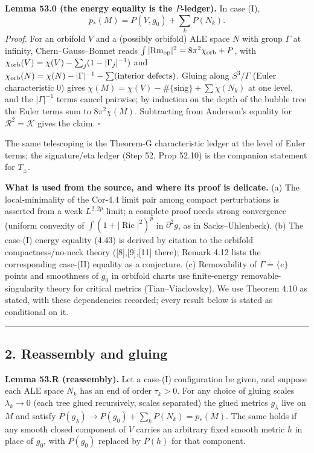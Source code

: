 \documentclass[
  10pt,
]{report}
\begin{document}
\textbf{Lemma 53.0 (the energy equality is the \(P\)-ledger).} In case
(I), \[
p_*(M)=P(V,g_0)+\sum_kP(N_k).
\] \emph{Proof.} For an orbifold \(V\) and a (possibly orbifold) ALE
space \(N\) with group \(\Gamma\) at infinity, Chern--Gauss--Bonnet
reads \(\int|\mathrm{Rm}_{\rm op}|^2=8\pi^2\chi_{\rm orb}+P\), with
\(\chi_{\rm orb}(V)=\chi(V)-\sum_j(1-|\Gamma_j|^{-1})\) and
\(\chi_{\rm orb}(N)=\chi(N)-|\Gamma|^{-1}-\sum(\text{interior defects})\).
Gluing along \(S^3/\Gamma\) (Euler characteristic 0) gives
\(\chi(M)=\chi(V)-\#\{\text{sing}\}+\sum\chi(N_k)\) at one level, and
the \(|\Gamma|^{-1}\) terms cancel pairwise; by induction on the depth
of the bubble tree the Euler terms sum to \(8\pi^2\chi(M)\). Subtracting
from Anderson's equality for \(\mathcal R^2=\mathcal K\) gives the
claim. \(\square\)

The same telescoping is the Theorem-G characteristic ledger at the level
of Euler terms; the signature/eta ledger (Step 52, Prop 52.10) is the
companion statement for \(T_\pm\).

\textbf{What is used from the source, and where its proof is delicate.}
(a) The local-minimality of the Cor-4.4 limit pair among compact
perturbations is asserted from a weak \(L^{2,2p}\) limit; a complete
proof needs strong convergence (uniform convexity of
\(\int(1+|\operatorname{Ric}|^2)^p\) in \(\partial^2g\), as in
Sacks--Uhlenbeck). (b) The case-(I) energy equality (4.43) is derived by
citation to the orbifold compactness/no-neck theory
({[}8{]},{[}9{]},{[}11{]} there); Remark 4.12 lists the corresponding
case-(II) equality as a conjecture. (c) Removability of \(\Gamma=\{e\}\)
points and smoothness of \(g_0\) in orbifold charts use finite-energy
removable-singularity theory for critical metrics (Tian--Viaclovsky). We
use Theorem 4.10 as stated, with these dependencies recorded; every
result below is stated as conditional on it.

\begin{center}\rule{0.5\linewidth}{0.5pt}\end{center}

\hypertarget{reassembly-and-gluing}{%
\subsection{2. Reassembly and gluing}\label{reassembly-and-gluing}}

\textbf{Lemma 53.R (reassembly).} Let a case-(I) configuration be given,
and suppose each ALE space \(N_k\) has an end of order \(\tau_k>0\). For
any choice of gluing scales \(\lambda_k\to0\) (each tree glued
recursively, scales separated) the glued metrics \(g_\lambda\) live on
\(M\) and satisfy \(P(g_\lambda)\to P(g_0)+\sum_kP(N_k)=p_*(M)\). The
same holds if any smooth closed component of \(V\) carries an arbitrary
fixed smooth metric \(h\) in place of \(g_0\), with \(P(g_0)\) replaced
by \(P(h)\) for that component.
\end{document}
